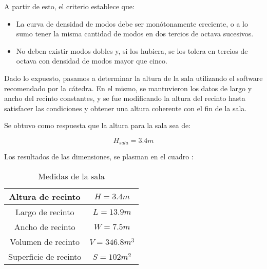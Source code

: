\par A partir de esto, el criterio establece que:

\begin{itemize}
    \item La curva de densidad de modos debe ser monótonamente creciente, o a lo sumo tener la misma cantidad de modos en dos tercios de octava sucesivos.
    \item No deben existir modos dobles y, si los hubiera, se los tolera en tercios de octava con densidad de modos mayor que cinco.
\end{itemize}

\par Dado lo expuesto, pasamos a determinar la altura de la sala utilizando el software  recomendado por la cátedra. En el mismo, se mantuvieron los datos de largo y ancho del recinto constantes, y se fue modificando la altura del recinto hasta satisfacer las condiciones y obtener una altura coherente con el fin de la sala.

\par Se obtuvo como respuesta que la altura para la sala sea de:

\begin{equation}
    H_{sala} = 3.4m
\end{equation}

\par Los resultados de las dimensiones, se plasman en el cuadro :

\begin{table}[]
    \centering
    \begin{tabular}{|c|c|} \hline
        Altura de recinto & $H =3.4m$ \\ \hline
        Largo de recinto  & $L = 13.9m$\\ \hline
        Ancho de recinto & $W = 7.5m$ \\ \hline
        Volumen de recinto & $V = 346.8 m^3$ \\ \hline
        Superficie de recinto & $S = 102m^2$\\ \hline
    \end{tabular}
    \caption{Medidas de la sala}
    \label{tab:medidas_de_sala}
\end{table}


